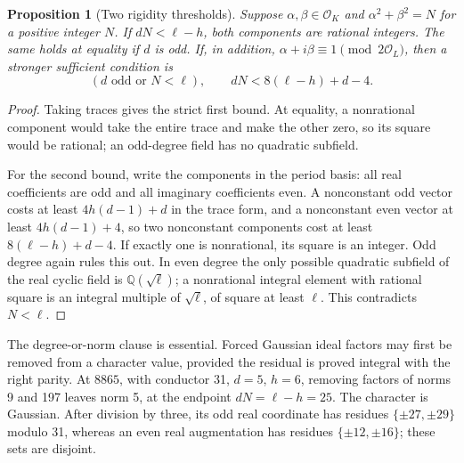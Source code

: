 \documentclass[11pt]{article}
\newtheorem{proposition}[theorem]{Proposition}
\theoremstyle{definition}
\theoremstyle{remark}
\begin{document}
\begin{proposition}[Two rigidity thresholds]\label{prop:smallnorm}
Suppose $\alpha,\beta\in\mathcal O_K$ and $\alpha^2+\beta^2=N$ for a
positive integer $N$.
If $dN<\ell-h$, both components are rational integers. The same holds
at equality if $d$ is odd.
If, in addition, $\alpha+i\beta\equiv1\pmod{2\mathcal O_L}$, then a
stronger sufficient condition is
\[
 (d\text{ odd or }N<\ell),\qquad dN<8(\ell-h)+d-4.
\]
\end{proposition}
\begin{proof}
Taking traces gives the strict first bound. At equality, a nonrational
component would take the entire trace and make the other zero, so its
square would be rational; an odd-degree field has no quadratic subfield.

For the second bound, write the components in the period basis: all real
coefficients are odd and all imaginary coefficients even. A nonconstant
odd vector costs at least $4h(d-1)+d$ in the trace form, and a nonconstant
even vector at least $4h(d-1)+4$, so two nonconstant components cost at
least $8(\ell-h)+d-4$. If exactly one is nonrational, its square is an
integer. Odd degree again rules this out. In even degree the only possible
quadratic subfield of the real cyclic field is $\mathbb Q(\sqrt\ell)$;
a nonrational integral element with rational square is an integral multiple
of $\sqrt\ell$, of square at least $\ell$. This contradicts $N<\ell$.
\end{proof}
The degree-or-norm clause is essential. Forced Gaussian ideal factors may
first be removed from a character value, provided the residual is proved
integral with the right parity. At $8865$, with conductor 31, $d=5$, $h=6$,
removing factors of norms 9 and 197 leaves norm 5, at the endpoint
$dN=\ell-h=25$. The character is Gaussian. After division by three, its odd
real coordinate has residues $\{\pm27,\pm29\}$ modulo 31, whereas an even
real augmentation has residues $\{\pm12,\pm16\}$; these sets are disjoint.
\end{document}
